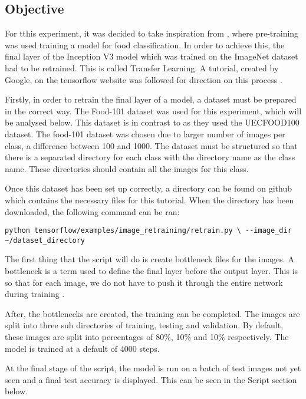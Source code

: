\subsection*{Objective}
For tthis experiment, it was decided to take inspiration from
\parencite{yanaiFood}, where pre-training was used training a model for food
classification. In order to achieve this, the final layer of the
Inception V3 model which was trained on the ImageNet dataset had to be retrained. This is called
Transfer Learning. A tutorial, created by Google, on the tensorflow website was followed
for direction on this process \parencite{retrainInception}.

Firstly, in order to retrain the final layer of a model, a dataset must be
prepared in the correct way. The Food-101 dataset \parencite{food101}
was used for this experiment, which will be analysed below.
This dataset is in contrast to \parencite{yanaiFood} as they used the UECFOOD100 dataset.
The food-101 dataset was chosen due to larger number of images per class, a difference between 100 and 1000.
The dataset must be structured so that
there is a separated directory for each class with the directory name as the class
name. These directories should contain all the images for this class. 

Once this dataset has been set up correctly, a directory can be found on github
which contains the necessary files for this tutorial. When the directory has
been downloaded, the following command can be ran:
\begin{lstlisting}
python tensorflow/examples/image_retraining/retrain.py \ --image_dir
~/dataset_directory
\end{lstlisting}

The first thing that the script will do is create bottleneck files for the
images. A bottleneck is a term used to define the final layer before the output
layer. This is so that for each image, we do not have to push it through the
entire network during training \parencite{retrainInception}.

After, the bottlenecks are created, the training can be completed. The images
are split into three sub directories of training, testing and validation. By
default, these images are split into percentages of 80\%, 10\% and 10\%
respectively. The model is trained at a default of 4000 steps. 

At the final stage of the script, the model is run on a batch of test images not
yet seen and a final test accuracy is displayed. This can be seen in the Script
section below.

